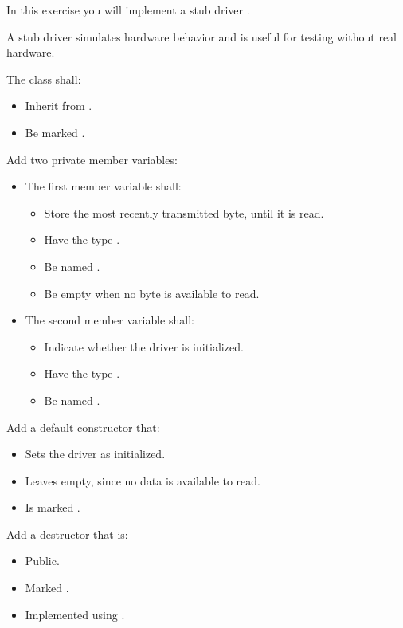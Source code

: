 \label{c4:ex:1.2}
In this exercise you will implement a stub driver .

A stub driver simulates hardware behavior and is useful for testing without real hardware.

The class shall:
\begin{itemize}
  \item Inherit from .
  \item Be marked .
\end{itemize}

Add two private member variables:
\begin{itemize}
  \item The first member variable shall:
  \begin{itemize}
    \item Store the most recently transmitted byte, until it is read.
    \item Have the type .
    \item Be named .
    \item Be empty when no byte is available to read.
  \end{itemize}
  \item The second member variable shall:
  \begin{itemize}
    \item Indicate whether the driver is initialized.
    \item Have the type .
    \item Be named .
  \end{itemize}
\end{itemize}

Add a default constructor that:
\begin{itemize}
  \item Sets the driver as initialized.
  \item Leaves  empty, since no data is available to read.
  \item Is marked .
\end{itemize}

Add a destructor that is:
\begin{itemize}
  \item Public.
  \item Marked .
  \item Implemented using .
\end{itemize}

